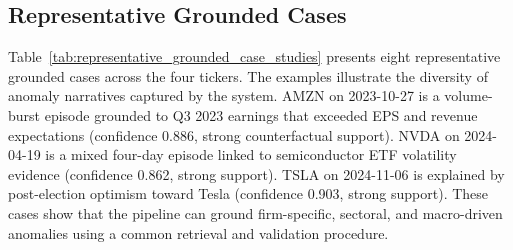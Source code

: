 \documentclass[11pt,a4paper,twoside]{article}
\begin{document}
\subsection{Representative Grounded Cases}

Table~\ref{tab:representative_grounded_case_studies} presents eight representative grounded cases across the four tickers. The examples illustrate the diversity of anomaly narratives captured by the system. AMZN on 2023-10-27 is a volume-burst episode grounded to Q3 2023 earnings that exceeded EPS and revenue expectations (confidence 0.886, strong counterfactual support). NVDA on 2024-04-19 is a mixed four-day episode linked to semiconductor ETF volatility evidence (confidence 0.862, strong support). TSLA on 2024-11-06 is explained by post-election optimism toward Tesla (confidence 0.903, strong support). These cases show that the pipeline can ground firm-specific, sectoral, and macro-driven anomalies using a common retrieval and validation procedure.
\end{document}
